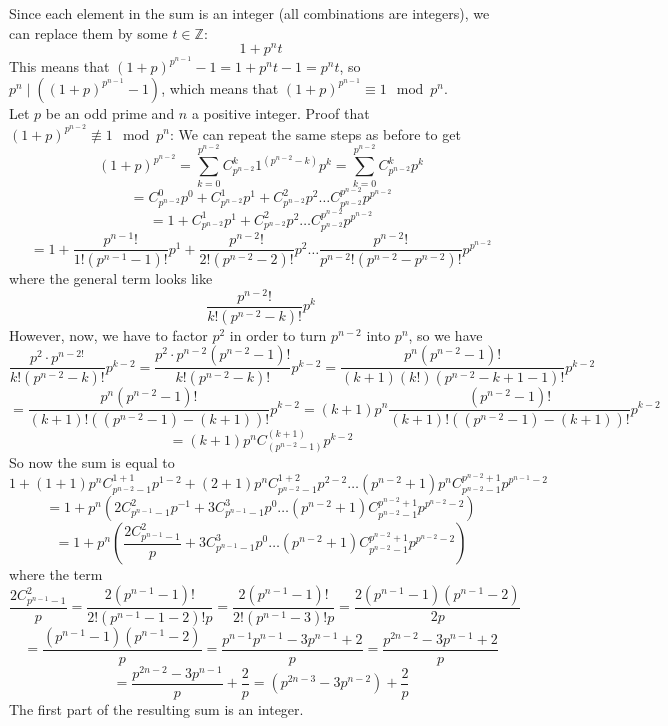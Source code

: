 \documentclass[12pt]{article}
\newcommand{\Z}{\mathbb{Z}}
\begin{document}
    Since each element in the sum is an integer
    (all combinations are integers),
    we can replace them by some $t \in \Z$:
    \[ 1 + p^nt\]
    This means that $(1 + p)^{p^{n-1}} - 1 = 1 + p^nt - 1
    = p^nt$,
    so $p^n \mid ((1 + p)^{p^{n-1}} - 1)$,
    which means that $(1 + p)^{p^{n-1}} \equiv 1 \mod p^n$. \\
    Let $p$ be an odd prime and $n$ a positive integer.
    Proof that $(1 + p)^{p^{n-2}} \not\equiv 1 \mod p^n$:
    We can repeat the same steps as before to get 
    \[ (1 + p)^{p^{n-2}}
    = \sum_{k = 0}^{p^{n-2}} C_{p^{n-2}}^{k}1^{(p^{n-2} - k)}p^k
    = \sum_{k = 0}^{p^{n-2}} C_{p^{n-2}}^{k}p^k \]
    \[ = C_{p^{n-2}}^0p^0 + C_{p^{n-2}}^1p^1 + C_{p^{n-2}}^2p^{2}
    \dots C_{p^{n-2}}^{p^{n-2}}p^{p^{n-2}} \]
    \[ = 1 + C_{p^{n-2}}^1p^1 + C_{p^{n-2}}^2p^2
    \dots C_{p^{n-2}}^{p^{n-2}}p^{p^{n-2}} \]
    \[ = 1 + \dfrac{p^{n-1}!}{1!(p^{n-1} - 1)!}p^1
    + \dfrac{p^{n-2}!}{2!(p^{n-2} - 2)!}p^2 \dots
    \dfrac{p^{n-2}!}{p^{n-2}!(p^{n-2} - p^{n-2})!}p^{p^{n-2}} \]
    where the general term looks like
    \[ \dfrac{p^{n-2}!}{k!(p^{n-2} - k)!}p^k \]
    However, now, we have to factor $p^2$ in order to turn
    $p^{n-2}$ into $p^n$, so we have
    \[ \dfrac{p^2 \cdot p^{n-2!}}{k!(p^{n-2} - k)!}p^{k-2}
    = \dfrac{p^2 \cdot p^{n-2}(p^{n-2} - 1)!}{k!(p^{n-2} - k)!}p^{k-2}
    = \dfrac{p^n(p^{n-2} - 1)!}{(k+1)(k!)(p^{n-2} - k + 1 - 1)!}p^{k-2} \]
    \[ = \dfrac{p^n(p^{n-2} - 1)!}{(k + 1)!((p^{n-2} - 1)-(k + 1))!}p^{k-2}
    = (k+1)p^n \dfrac{(p^{n-2}-1)!}{(k + 1)!((p^{n-2}-1)-(k + 1))!}p^{k-2} \]
    \[ = (k+1)p^n C_{(p^{n-2} - 1)}^{(k+1)} p^{k-2} \]
    So now the sum is equal to
    \[ 1 + (1 + 1)p^nC_{p^{n-2} - 1}^{1 + 1}p^{1-2}
    + (2+1)p^nC_{p^{n-2} - 1}^{1 + 2}p^{2-2} \dots
    (p^{n-2}+1)p^nC_{p^{n-2} - 1}^{p^{n-2} + 1}p^{p^{n-1}-2} \]
    \[ = 1 + p^n(2C_{p^{n-1} - 1}^{2}p^{-1}
    + 3C_{p^{n-1} - 1}^{3}p^{0} \dots
    (p^{n-2}+1)C_{p^{n-2} - 1}^{p^{n-2} + 1}p^{p^{n-2}-2}) \]
    \[ = 1 + p^n( \dfrac{2C_{p^{n-1} - 1}^{2}}{p}
    + 3C_{p^{n-1} - 1}^{3}p^{0} \dots
    (p^{n-2}+1)C_{p^{n-2} - 1}^{p^{n-2} + 1}p^{p^{n-2}-2}) \]
    where the term
    \[ \dfrac{2C_{p^{n-1} - 1}^{2}}{p}
    = \dfrac{2(p^{n-1} - 1)!}{2!(p^{n-1} - 1 - 2)!p} 
    = \dfrac{2(p^{n-1} - 1)!}{2!(p^{n-1} - 3)!p}
    = \dfrac{2(p^{n-1} - 1)(p^{n-1} - 2)}{2p} \]
    \[ = \dfrac{(p^{n-1} - 1)(p^{n-1} - 2)}{p}
    = \dfrac{p^{n-1}p^{n-1} - 3p^{n-1} + 2}{p}
    = \dfrac{p^{2n-2} - 3p^{n-1} + 2}{p} \]
    \[ = \dfrac{p^{2n-2} - 3p^{n-1}}{p} + \dfrac{2}{p} 
    = (p^{2n-3} - 3p^{n-2}) + \dfrac{2}{p} \]
    The first part of the resulting sum is an integer.
\end{document}
